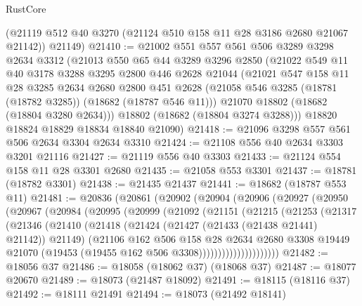 \begin{lexlean}{RustCore}
\begin{coremodule}
      (@21119 @512 @40 @3270 (@21124 @510 @158 @11 @28 @3186 @2680 @21067 @21142))
      @21149)
@21410 := @21002
    @551
    @557
    @561
    @506
    @3289
    @3298
    @2634
    @3312
    (@21013
      @550
      @65
      @44
      @3289
      @3296
      @2850
      (@21022
        @549
        @11
        @40
        @3178
        @3288
        @3295
        @2800
        @446
        @2628
        @21044
        (@21021
          @547
          @158
          @11
          @28
          @3285
          @2634
          @2680
          @2800
          @451
          @2628
          (@21058 @546 @3285 (@18781 (@18782 @3285)) (@18682 (@18787 @546 @11)))
          @21070
          @18802
          (@18682 (@18804 @3280 @2634)))
        @18802
        (@18682 (@18804 @3274 @3288)))
      @18820
      @18824
      @18829
      @18834
      @18840
      @21090)
@21418 := @21096 @3298 @557 @561 @506 @2634 @3304 @2634 @3310
@21424 := @21108 @556 @40 @2634 @3303 @3201 @21116
@21427 := @21119 @556 @40 @3303
@21433 := @21124 @554 @158 @11 @28 @3301 @2680
@21435 := @21058 @553 @3301
@21437 := @18781 (@18782 @3301)
@21438 := @21435 @21437
@21441 := @18682 (@18787 @553 @11)
@21481 := @20836
    (@20861
      (@20902
        (@20904
          (@20906
            (@20927
              (@20950
                (@20967
                  (@20984
                    (@20995
                      (@20999
                        (@21092
                          (@21151
                            (@21215
                              (@21253
                                (@21317
                                  (@21346
                                    (@21410
                                      (@21418
                                        (@21424 (@21427 (@21433 (@21438 @21441) @21142)) @21149)
                                        (@21106
                                          @162
                                          @506
                                          @158
                                          @28
                                          @2634
                                          @2680
                                          @3308
                                          @19449
                                          @21070
                                          (@19453 (@19455 @162 @506 @3308)))))))))))))))))))))
@21482 := @18056 @37
@21486 := @18058 (@18062 @37) (@18068 @37)
@21487 := @18077 @20670
@21489 := @18073 (@21487 @18092)
@21491 := @18115 (@18116 @37)
@21492 := @18111 @21491
@21494 := @18073 (@21492 @18141)

\end{coremodule}
\end{lexlean}
